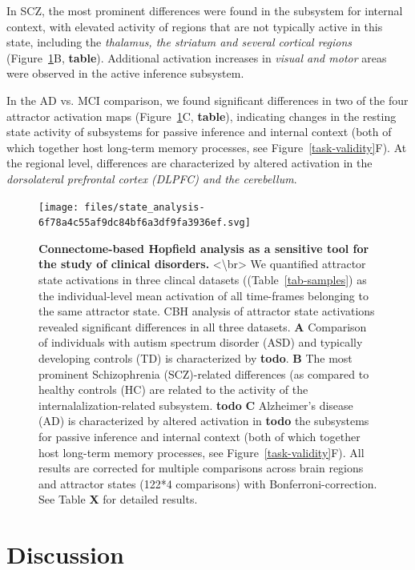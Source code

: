 \documentclass{article}
\begin{document}
In SCZ, the most prominent differences were found in the subsystem for internal context, with elevated activity of
regions that are not typically active in this state, including the \textit{thalamus, the striatum and several cortical regions}
(Figure~\ref{clinical-validity}B, \textbf{table}). Additional activation increases in \textit{visual and motor} areas were observed in
the active inference subsystem.

In the AD vs. MCI comparison, we found significant differences in two of the four attractor activation maps
(Figure~\ref{clinical-validity}C, \textbf{table}), indicating changes in the resting state activity of subsystems for passive
inference and internal context (both of which together host long-term memory processes, see Figure~\ref{task-validity}F).
At the regional level, differences are characterized by altered activation in the \textit{dorsolateral prefrontal cortex
(DLPFC) and the cerebellum}.

\begin{figure}[!htbp]
\centering
\texttt{[image: files/state\_analysis-6f78a4c55af9dc84bf6a3df9fa3936ef.svg]}
\caption[]{\textbf{Connectome-based Hopfield analysis as a sensitive tool for the study of clinical disorders.} \newline
\textless {\textbackslash}br\textgreater 
We quantified attractor state activations in three clincal datasets ((Table~\ref{tab-samples}) as the
individual-level mean activation of all time-frames belonging to the same attractor state. CBH analysis of attractor
state activations revealed significant differences in all three datasets.
\textbf{A} Comparison of individuals with autism spectrum disorder (ASD) and typically developing controls (TD) is
characterized by \textbf{todo}.
\textbf{B} The most prominent Schizophrenia (SCZ)-related differences (as compared to healthy controls (HC) are related to
the activity of the internalalization-related subsystem. \textbf{todo}
\textbf{C} Alzheimer's disease (AD) is characterized by altered activation in \textbf{todo} the subsystems for passive inference
and internal context (both of which together host long-term memory processes, see Figure~\ref{task-validity}F). All
results are corrected for multiple comparisons across brain regions and attractor states (122*4 comparisons)
with Bonferroni-correction. See Table \textbf{X} for detailed results.}
\label{clinical-validity}
\end{figure}

\section{Discussion}\label{Discussion}
\end{document}
